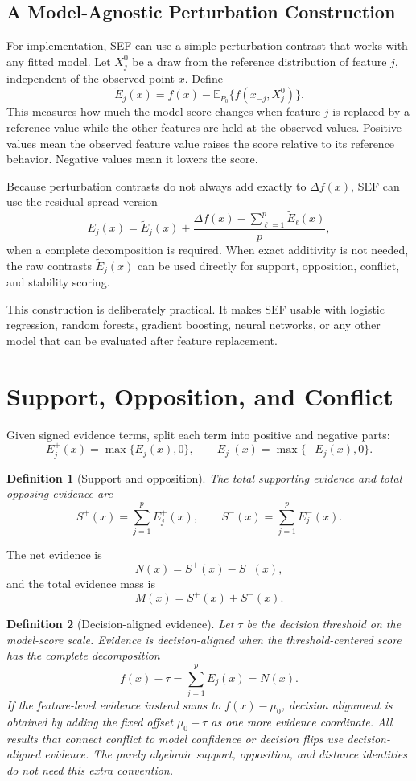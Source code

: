 \documentclass[11pt]{article}
\newtheorem{definition}{Definition}
\newcommand{\E}{\mathbb{E}}
\begin{document}
\subsection{A Model-Agnostic Perturbation Construction}

For implementation, SEF can use a simple perturbation contrast that works with any fitted model. Let $X_j^0$ be a draw from the reference distribution of feature $j$, independent of the observed point $x$. Define
\[
\widetilde{E}_j(x)
=
f(x)-
\E_{P_0}\{f(x_{-j},X_j^0)\}.
\]
This measures how much the model score changes when feature $j$ is replaced by a reference value while the other features are held at the observed values. Positive values mean the observed feature value raises the score relative to its reference behavior. Negative values mean it lowers the score.

Because perturbation contrasts do not always add exactly to $\Delta f(x)$, SEF can use the residual-spread version
\[
E_j(x)
=
\widetilde{E}_j(x)
+
\frac{\Delta f(x)-\sum_{\ell=1}^p \widetilde{E}_\ell(x)}
{p},
\]
when a complete decomposition is required. When exact additivity is not needed, the raw contrasts $\widetilde{E}_j(x)$ can be used directly for support, opposition, conflict, and stability scoring.

This construction is deliberately practical. It makes SEF usable with logistic regression, random forests, gradient boosting, neural networks, or any other model that can be evaluated after feature replacement.

\section{Support, Opposition, and Conflict}

Given signed evidence terms, split each term into positive and negative parts:
\[
E_j^+(x)=\max\{E_j(x),0\},
\qquad
E_j^-(x)=\max\{-E_j(x),0\}.
\]

\begin{definition}[Support and opposition]
The total supporting evidence and total opposing evidence are
\[
S^+(x)=\sum_{j=1}^p E_j^+(x),
\qquad
S^-(x)=\sum_{j=1}^p E_j^-(x).
\]
\end{definition}

The net evidence is
\[
N(x)=S^+(x)-S^-(x),
\]
and the total evidence mass is
\[
M(x)=S^+(x)+S^-(x).
\]

\begin{definition}[Decision-aligned evidence]
Let $\tau$ be the decision threshold on the model-score scale. Evidence is
\emph{decision-aligned} when the threshold-centered score has the complete
decomposition
\[
f(x)-\tau=\sum_{j=1}^p E_j(x)=N(x).
\]
If the feature-level evidence instead sums to $f(x)-\mu_0$, decision alignment
is obtained by adding the fixed offset $\mu_0-\tau$ as one more evidence
coordinate. All results that connect conflict to model confidence or decision
flips use decision-aligned evidence. The purely algebraic support, opposition,
and distance identities do not need this extra convention.
\end{definition}
\end{document}
